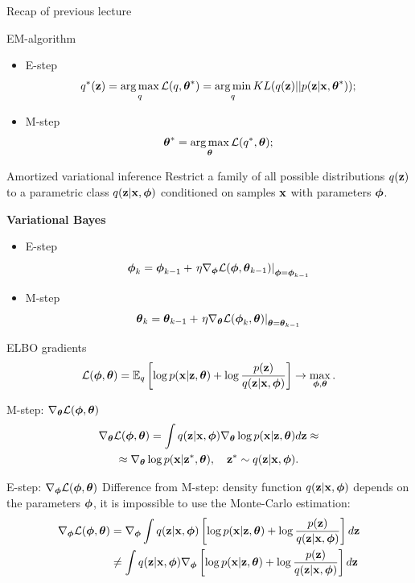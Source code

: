 \begin{frame}{Recap of previous lecture}
	\begin{block}{EM-algorithm}
	\begin{itemize}
		\item E-step
		\[
			q^*(\mathbf{z}) = \operatorname*{arg\,max}_q \mathcal{L} (q, \boldsymbol{\theta}^*)
			= \operatorname*{arg\,min}_q KL(q(\mathbf{z}) || p(\mathbf{z} | \mathbf{x}, \boldsymbol{\theta}^*));
		\]
		\item M-step
		\[
			\boldsymbol{\theta}^* = \operatorname*{arg\,max}_{\boldsymbol{\theta}} \mathcal{L} (q^*, \boldsymbol{\theta});
		\]
	\end{itemize}
	\vspace{-0.3cm}
	\end{block}
	\begin{block}{Amortized variational inference}
	Restrict a family of all possible distributions $q(\mathbf{z})$ to a parametric class $q(\mathbf{z}|\mathbf{x}, \boldsymbol{\phi})$ conditioned on samples $\mathbf{x}$ with parameters $\boldsymbol{\phi}$.
	\end{block}
	
	\textbf{Variational Bayes}
	\begin{itemize}
		\item E-step
		\[
		\boldsymbol{\phi}_k = \boldsymbol{\phi}_{k-1} + \left.\eta \nabla_{\boldsymbol{\phi}} \mathcal{L}(\boldsymbol{\phi}, \boldsymbol{\theta}_{k-1})\right|_{\boldsymbol{\phi}=\boldsymbol{\phi}_{k-1}}
		\]
		\item M-step
		\[
		\boldsymbol{\theta}_k = \boldsymbol{\theta}_{k-1} + \left.\eta \nabla_{\boldsymbol{\theta}} \mathcal{L}(\boldsymbol{\phi}_k, \boldsymbol{\theta})\right|_{\boldsymbol{\theta}=\boldsymbol{\theta}_{k-1}}
		\]
	\end{itemize}
\end{frame}
\begin{frame}{ELBO gradients}
	\[
		 \mathcal{L} (\boldsymbol{\phi}, \boldsymbol{\theta})  = \mathbb{E}_{q} \left[\log p(\mathbf{x} | \mathbf{z}, \boldsymbol{\theta}) + \log \frac{p(\mathbf{z})}{q(\mathbf{z} | \mathbf{x}, \boldsymbol{\phi})} \right] \rightarrow \max_{\boldsymbol{\phi}, \boldsymbol{\theta}}.
	\]	
	\begin{block}{M-step: $\nabla_{\boldsymbol{\theta}} \mathcal{L}(\boldsymbol{\phi}, \boldsymbol{\theta})$}
		\vspace{-0.7cm}
		\begin{multline*}
			\nabla_{\boldsymbol{\theta}} \mathcal{L} (\boldsymbol{\phi}, \boldsymbol{\theta})
			= \int q(\mathbf{z}|\mathbf{x}, \boldsymbol{\phi}) \nabla_{\boldsymbol{\theta}}\log p(\mathbf{x}|\mathbf{z}, \boldsymbol{\theta}) d \mathbf{z} \approx  \\
			\approx \nabla_{\boldsymbol{\theta}}\log p(\mathbf{x}|\mathbf{z}^*, \boldsymbol{\theta}), \quad \mathbf{z}^* \sim q(\mathbf{z}|\mathbf{x}, \boldsymbol{\phi}).
		\end{multline*}
		\vspace{-0.7cm}
	\end{block}
	\begin{block}{E-step: $\nabla_{\boldsymbol{\phi}} \mathcal{L}(\boldsymbol{\phi}, \boldsymbol{\theta})$}
	Difference from M-step: density function $q(\mathbf{z}| \mathbf{x}, \boldsymbol{\phi})$ depends on the parameters $\boldsymbol{\phi}$, it is impossible to use the Monte-Carlo estimation:
	\begin{align*}
		\nabla_{\boldsymbol{\phi}} \mathcal{L} (\boldsymbol{\phi}, \boldsymbol{\theta}) &= \nabla_{\boldsymbol{\phi}} \int q(\mathbf{z} | \mathbf{x}, \boldsymbol{\phi}) \left[\log p(\mathbf{x} | \mathbf{z}, \boldsymbol{\theta}) + \log \frac{p(\mathbf{z})}{q(\mathbf{z}| \mathbf{x}, \boldsymbol{\phi})} \right] d \mathbf{z} \\
		& \neq  \int q(\mathbf{z} | \mathbf{x}, \boldsymbol{\phi}) \nabla_{\boldsymbol{\phi}} \left[\log p(\mathbf{x} | \mathbf{z}, \boldsymbol{\theta}) + \log \frac{p(\mathbf{z})}{q(\mathbf{z}| \mathbf{x}, \boldsymbol{\phi})} \right] d \mathbf{z} \\
	\end{align*}
	\end{block}
\end{frame}
